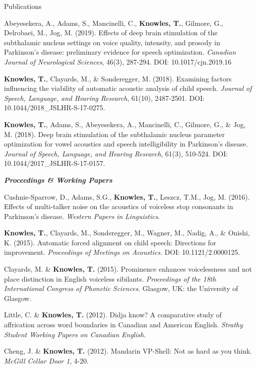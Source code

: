 \documentclass{resume} %
\begin{document}
\begin{rSection}{Publications}
\begin{etaremune}
	\item Abeyesekera, A., Adams, S., Mancinelli, C., {\bf Knowles, T.}, Gilmore, G., Delrobaei, M., Jog, M. (2019).  Effects of deep brain stimulation of the subthalamic nucleus settings on voice quality, intensity, and prosody in Parkinson’s disease: preliminary evidence for speech optimization. \emph{Canadian Journal of Neurological Sciences}, 46(3), 287-294. DOI: 10.1017/cjn.2019.16	

	\item {\bf Knowles, T.}, Clayards, M., \& Sonderegger, M. (2018). Examining factors influencing the viability of automatic acoustic analysis of child speech. \emph{Journal of Speech, Language, and Hearing Research}, 61(10), 2487-2501. DOI: 10.1044/2018\_JSLHR-S-17-0275.

	\item {\bf Knowles, T.}, Adams, S., Abeyesekera, A., Mancinelli, C., Gilmore, G., \& Jog, M. (2018). Deep brain stimulation of the subthalamic nucleus parameter optimization for vowel acoustics and speech intelligibility in Parkinson's disease. \emph{Journal of Speech, Language, and Hearing Research}, 61(3), 510-524. DOI: 10.1044/2017\_JSLHR-S-17-0157.

\end{etaremune}

\begin{center}
	{\bf \emph{Proceedings \& Working Papers}}
\end{center}

\begin{etaremune}

	\item Cushnie-Sparrow, D., Adams, S.G., {\bf Knowles, T.}, Leszcz, T.M., Jog, M. (2016). Effects of multi-talker noise on the acoustics of voiceless stop consonants in Parkinson's disease. \emph{Western Papers in Linguistics.}

	\item {\bf Knowles, T.}, Clayards, M., Sonderegger, M., Wagner, M., Nadig, A., \& Onishi, K. (2015). Automatic forced alignment on child speech: Directions for improvement. \emph{Proceedings of Meetings on Acoustics.} DOI: 10.1121/2.0000125.

	\item Clayards, M. \& {\bf Knowles, T.} (2015). Prominence enhances voicelessness and not place distinction in English voiceless sibilants. \emph{Proceedings of the 18th International Congress of Phonetic Sciences.} Glasgow, UK: the University of Glasgow.

	\item Little, C. \& {\bf Knowles, T.} (2012). Didja know? A comparative study of affrication across word boundaries in Canadian and American English. \emph{Strathy Student Working Papers on Canadian English.}

	\item Cheng, J. \& {\bf Knowles, T.} (2012). Mandarin VP-Shell: Not as hard as you think. \emph{McGill Cellar Door 1}, 4-20.

\end{etaremune}

\end{rSection}
\end{document}
